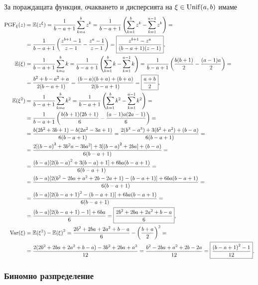 \documentclass[numbers=endperiod, DIV=15, bibliography=totocnumbered]{scrartcl}
\begin{document}
За пораждащата функция, очакването и дисперсията на $\xi \in \operatorname{Unif}(a, b)$ имаме
\begingroup
\allowdisplaybreaks
\begin{align*}
  \operatorname{PGF}_\xi(z)
  &=
  \mathbb{E}(z^\xi)
  =
  \frac 1 {b-a+1} \sum_{k=a}^b z^k
  =
  \frac 1 {b-a+1} \left( \sum_{k=1}^b z^k - \sum_{k=1}^{a-1} z^k \right)
  = \\ &=
  \frac 1 {b-a+1} \left(\frac {z^{b+1} - 1} {z - 1} - \frac {z^a - 1} {z - 1} \right)
  =
  \boxed{\frac {z^{b+1} - z^a} {(b-a+1)(z-1)}},
  \\
  \mathbb{E}(\xi)
  &=
  \frac 1 {b-a+1} \sum_{k=a}^b k
  =
  \frac 1 {b-a+1} \left( \sum_{k=1}^b k - \sum_{k=1}^{a-1} k \right)
  =
  \frac 1 {b-a+1} \left( \frac {b(b+1)} 2 - \frac {(a-1)a} 2 \right)
  = \\ &=
  \frac {b^2 + b - a^2 + a} {2(b-a+1)}
  =
  \frac {(b-a)(b+a) + (b+a)} {2(b-a+1)}
  =
  \boxed{\frac {a+b} 2},
  \\
  \mathbb{E}(\xi^2)
  &=
  \frac 1 {b-a+1} \sum_{k=a}^b k^2
  =
  \frac 1 {b-a+1} \left( \sum_{k=1}^b k^2 - \sum_{k=1}^{a-1} k^2 \right)
  = \\ &=
  \frac 1 {b-a+1} \left( \frac {b(b+1)(2b+1)} 6 - \frac {(a-1)a(2a-1)} 6 \right)
  = \\ &=
  \frac {b(2b^2 + 3b + 1) - b(2a^2 - 3a + 1)} {6(b-a+1)}
  =
  \frac {2(b^3 - a^3) + 3(b^2 + a^2) + (b-a)} {6(b-a+1)}
  = \\ &=
  \frac {2[{(b-a)}^3 + 3b^2a - 3ba^2] + 3[{(b-a)}^2 + 2ba] + (b-a)} {6(b-a+1)}
  = \\ &=
  \frac {(b-a) [2{(b-a)}^2 + 3(b-a) + 1] + 6ba(b-a+1)} {6(b-a+1)}
  = \\ &=
  \frac {(b-a) [2(b^2 - 2ba + a^2 + 2b - 2a + 1) - (b-a+1)] + 6ba(b-a+1)} {6(b-a+1)}
  = \\ &=
  \frac {(b-a) [2{(b-a+1)}^2 - (b-a+1)] + 6ba(b-a+1)} {6(b-a+1)}
  = \\ &=
  \frac {(b-a) [2(b-a+1)-1] + 6ba} 6
  =
  \boxed{\frac {2b^2+2ba+2a^2+b-a} 6},
  \\
  \operatorname{Var}(\xi)
  &=
  \mathbb{E}(\xi^2) - {\mathbb{E}(\xi)}^2
  =
  \frac {2b^2+2ba+2a^2+b-a} 6 - {\left( \frac {b+a} 2 \right)}^2
  = \\ &=
  \frac {2(2b^2+2ba+2a^2+b-a) - 3{b^2+2ba+a^2}} {12}
  =
  \frac {b^2-2ba+a^2+2b-2a} {12}
  =
  \boxed{\frac {{(b-a+1)}^2-1} {12}}.
\end{align*}
\endgroup

\subsubsection{Биномно разпределение}\label{dist:binomial}
\end{document}
